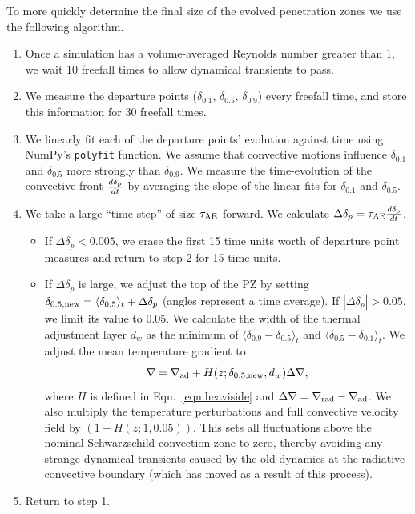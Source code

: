 \documentclass[twocolumn]{aastex631}
\newcommand{\gradrad}{\ensuremath{\nabla_{\rm{rad}}}}
\newcommand{\gradad}{\ensuremath{\nabla_{\rm{ad}}}}
\newcommand{\justgrad}{\ensuremath{\nabla}}
\newcommand{\delp}{\ensuremath{\delta_{\rm{p}}}}
\newcommand{\angles}[1]{\langle #1 \rangle}
\begin{document}
To more quickly determine the final size of the evolved penetration zones we use the following algorithm.
\begin{enumerate}
\item Once a simulation has a volume-averaged Reynolds number greater than 1, we wait 10 freefall times to allow dynamical transients to pass.
\item We measure the departure points ($\delta_{0.1}$, $\delta_{0.5}$, $\delta_{0.9}$) every freefall time, and store this information for 30 freefall times.
\item We linearly fit each of the departure points' evolution against time using NumPy's \texttt{polyfit} function.
We assume that convective motions influence $\delta_{0.1}$ and $\delta_{0.5}$ more strongly than $\delta_{0.9}$.
We measure the time-evolution of the convective front $\frac{d \delp}{dt}$ by averaging the slope of the linear fits for $\delta_{0.1}$ and $\delta_{0.5}$.
\item We take a large ``time step'' of size $\tau_{\rm{AE}}$ forward.
We calculate $\Delta \delta_p = \tau_{\rm{AE}} \frac{d \delp}{dt}$.
\begin{itemize}
\item If $\Delta \delta_p < 0.005$, we erase the first 15 time units worth of departure point measures and return to step 2 for 15 time units.
\item  If $\Delta \delta_p$ is large, we adjust the top of the PZ by setting $\delta_{0.5,\rm{new}} = \angles{\delta_{0.5}}_t + \Delta \delta_p$ (angles represent a time average).
If $|\Delta \delta_p| > 0.05$, we limit its value to 0.05.
We calculate the width of the thermal adjustment layer $d_w$ as the minimum of $\angles{\delta_{0.9} - \delta_{0.5}}_t$ and $\angles{\delta_{0.5} - \delta_{0.1}}_t$.
We adjust the mean temperature gradient to
\begin{equation}
\justgrad = \gradad + H(z; \delta_{\rm{0.5,\rm{new}}}, d_w) \Delta\justgrad,
\label{eqn:initial_grad}
\end{equation}
where $H$ is defined in Eqn.~\ref{eqn:heaviside} and $\Delta\justgrad = \gradrad - \gradad$.
We also multiply the temperature perturbations and full convective velocity field by $(1 - H(z; 1, 0.05))$.
This sets all fluctuations above the nominal Schwarzschild convection zone to zero, thereby avoiding any strange dynamical transients caused by the old dynamics at the radiative-convective boundary (which has moved as a result of this process).
\end{itemize}
\item Return to step 1.
\end{enumerate}
\end{document}
